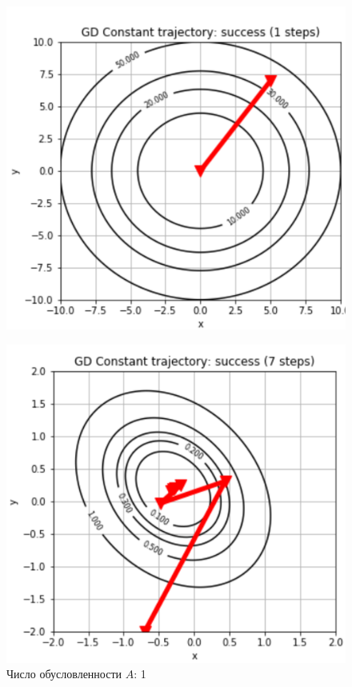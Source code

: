\begin{figure}[H]
            \centering
            \includegraphics[scale=0.25]{images/2-3-traj1.png}
            \label{ris:im225}
            \caption{Число обусловленности $A$: 1}
            \endminipage\hfill
            \centering
            \includegraphics[scale=0.25]{images/2-3-traj2.png}

\end{figure}
